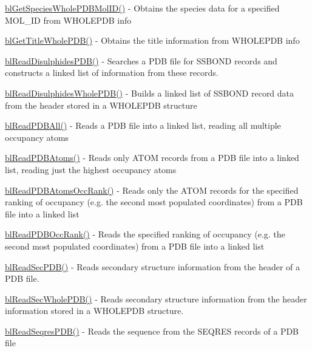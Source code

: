 \begin{DoxyItemize}
\item \hyperlink{pdb_8h_a33415e6d8ecd4bf670f8b3846a9fb90d}{bl\-Get\-Species\-Whole\-P\-D\-B\-Mol\-I\-D()} -\/ Obtains the species data for a specified M\-O\-L\-\_\-\-I\-D from W\-H\-O\-L\-E\-P\-D\-B info
\item \hyperlink{pdb_8h_a8f59413f497349ebcefb4ba1ab6184ee}{bl\-Get\-Title\-Whole\-P\-D\-B()} -\/ Obtains the title information from W\-H\-O\-L\-E\-P\-D\-B info
\item \hyperlink{pdb_8h_a276c10597c8d0404d380466286f45f0e}{bl\-Read\-Disulphides\-P\-D\-B()} -\/ Searches a P\-D\-B file for S\-S\-B\-O\-N\-D records and constructs a linked list of information from these records.
\item \hyperlink{pdb_8h_a625b0cfdb07d179234c2399a02f035c5}{bl\-Read\-Disulphides\-Whole\-P\-D\-B()} -\/ Builds a linked list of S\-S\-B\-O\-N\-D record data from the header stored in a W\-H\-O\-L\-E\-P\-D\-B structure
\item \hyperlink{pdb_8h_a23cbc720ce99c3bdaf61d42960df970a}{bl\-Read\-P\-D\-B\-All()} -\/ Reads a P\-D\-B file into a linked list, reading all multiple occupancy atoms
\item \hyperlink{pdb_8h_acd3668492022bd2b8fb630dd2ee250b7}{bl\-Read\-P\-D\-B\-Atoms()} -\/ Reads only A\-T\-O\-M records from a P\-D\-B file into a linked list, reading just the highest occupancy atoms
\item \hyperlink{pdb_8h_aa282352d949c323303ef5323432006f2}{bl\-Read\-P\-D\-B\-Atoms\-Occ\-Rank()} -\/ Reads only the A\-T\-O\-M records for the specified ranking of occupancy (e.\-g. the second most populated coordinates) from a P\-D\-B file into a linked list
\item \hyperlink{pdb_8h_aa303aa30446e8ca03c7deb6b6a496dc6}{bl\-Read\-P\-D\-B\-Occ\-Rank()} -\/ Reads the specified ranking of occupancy (e.\-g. the second most populated coordinates) from a P\-D\-B file into a linked list
\item \hyperlink{pdb_8h_a301c5031ec640bcc41cdca87818ac50c}{bl\-Read\-Sec\-P\-D\-B()} -\/ Reads secondary structure information from the header of a P\-D\-B file.
\item \hyperlink{pdb_8h_a33509dcd8e1c9d239a31adecd138aeff}{bl\-Read\-Sec\-Whole\-P\-D\-B()} -\/ Reads secondary structure information from the header information stored in a W\-H\-O\-L\-E\-P\-D\-B structure.
\item \hyperlink{pdb_8h_a48d84abb9adcd40bacbfaeeaf0f7b1b2}{bl\-Read\-Seqres\-P\-D\-B()} -\/ Reads the sequence from the S\-E\-Q\-R\-E\-S records of a P\-D\-B file

\end{DoxyItemize}
